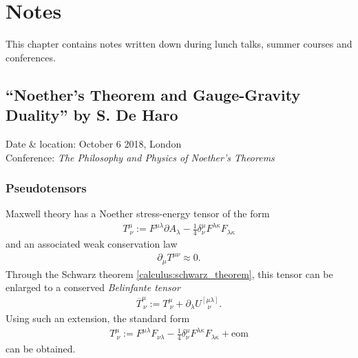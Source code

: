 \chapter{Notes}

    This chapter contains notes written down during lunch talks, summer courses and conferences.

\section{``Noether's Theorem and Gauge-Gravity Duality'' by S. De Haro}

    Date \& location: October 6 2018, London\\
    Conference: \textit{The Philosophy and Physics of Noether's Theorems}

\subsection{Pseudotensors}

    Maxwell theory has a Noether stress-energy tensor of the form
    \begin{gather}
        T^\mu_{\ \nu} := F^{\mu\lambda}\partial A_\lambda - \frac{1}{4}\delta^\mu_\nu F^{\lambda\kappa}F_{\lambda\kappa}
    \end{gather}
    and an associated weak conservation law
    \begin{gather}
        \partial_\mu T^{\mu\nu}\approx 0.
    \end{gather}
    Through the Schwarz theorem \ref{calculus:schwarz_theorem}, this tensor can be enlarged to a conserved \textit{Belinfante tensor}
    \begin{gather}
        \overline{T}^\mu_{\ \nu} := T^\mu_{\ \nu} + \partial_\lambda U^{[\mu\lambda]}_{\ \ \ \ \nu}.
    \end{gather}
    Using such an extension, the standard form
    \begin{gather}
        T^\mu_{\ \nu} := F^{\mu\lambda}F_{\nu\lambda} - \frac{1}{4}\delta^\mu_\nu F^{\lambda\kappa}F_{\lambda\kappa} + \text{eom}
    \end{gather}
    can be obtained.

